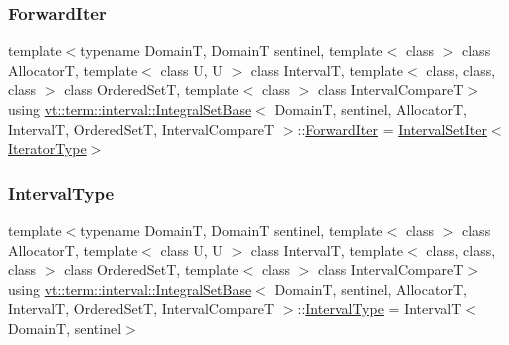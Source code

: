 \mbox{\label{structvt_1_1term_1_1interval_1_1_integral_set_base_abd0d7f40a96384d2db0a2782a8921a34}} 
\subsubsection{\texorpdfstring{Forward\+Iter}{ForwardIter}}
{\footnotesize\ttfamily template$<$typename DomainT, DomainT sentinel, template$<$ class $>$ class AllocatorT, template$<$ class U, U $>$ class IntervalT, template$<$ class, class, class $>$ class Ordered\+SetT, template$<$ class $>$ class Interval\+CompareT$>$ \\
using \hyperlink{structvt_1_1term_1_1interval_1_1_integral_set_base}{vt\+::term\+::interval\+::\+Integral\+Set\+Base}$<$ DomainT, sentinel, AllocatorT, IntervalT, Ordered\+SetT, Interval\+CompareT $>$\+::\hyperlink{structvt_1_1term_1_1interval_1_1_integral_set_base_abd0d7f40a96384d2db0a2782a8921a34}{Forward\+Iter} =  \hyperlink{structvt_1_1term_1_1interval_1_1_integral_set_base_1_1_interval_set_iter}{Interval\+Set\+Iter}$<$\hyperlink{structvt_1_1term_1_1interval_1_1_integral_set_base_a111b2ec1ea960a40ba4270be702f11f1}{Iterator\+Type}$>$}

\mbox{\label{structvt_1_1term_1_1interval_1_1_integral_set_base_a1f8f5bb84064be35bbaaf15bb5a43f14}} 
\subsubsection{\texorpdfstring{Interval\+Type}{IntervalType}}
{\footnotesize\ttfamily template$<$typename DomainT, DomainT sentinel, template$<$ class $>$ class AllocatorT, template$<$ class U, U $>$ class IntervalT, template$<$ class, class, class $>$ class Ordered\+SetT, template$<$ class $>$ class Interval\+CompareT$>$ \\
using \hyperlink{structvt_1_1term_1_1interval_1_1_integral_set_base}{vt\+::term\+::interval\+::\+Integral\+Set\+Base}$<$ DomainT, sentinel, AllocatorT, IntervalT, Ordered\+SetT, Interval\+CompareT $>$\+::\hyperlink{structvt_1_1term_1_1interval_1_1_integral_set_base_a1f8f5bb84064be35bbaaf15bb5a43f14}{Interval\+Type} =  IntervalT$<$DomainT, sentinel$>$}

